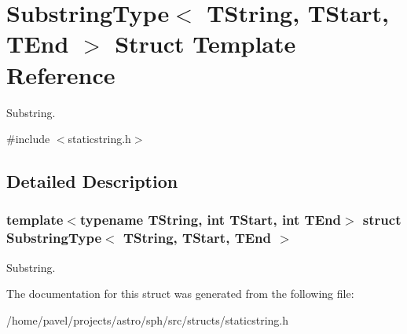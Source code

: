 \hypertarget{structSubstringType}{}\section{Substring\+Type$<$ T\+String, T\+Start, T\+End $>$ Struct Template Reference}
\label{structSubstringType}


Substring.  




{\ttfamily \#include $<$staticstring.\+h$>$}



\subsection{Detailed Description}
\subsubsection*{template$<$typename T\+String, int T\+Start, int T\+End$>$\newline
struct Substring\+Type$<$ T\+String, T\+Start, T\+End $>$}

Substring. 

The documentation for this struct was generated from the following file\+:\begin{DoxyCompactItemize}
\item 
/home/pavel/projects/astro/sph/src/structs/staticstring.\+h\end{DoxyCompactItemize}
